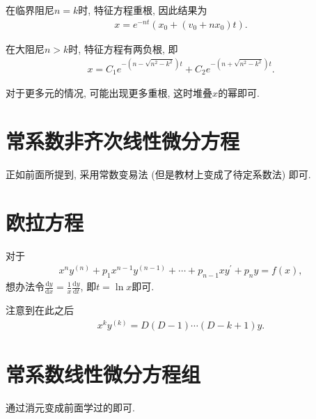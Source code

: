 \documentclass[UTF8,a4paper,11pt]{ctexart}
\begin{document}
    在临界阻尼$n=k$时, 特征方程重根, 因此结果为
    \[
    \begin{aligned}
      x=e^{-nt}\left(x_0+\left(v_0+nx_0\right)t\right).
    \end{aligned}
    \]
    
    在大阻尼$n>k$时, 特征方程有两负根, 即
    \[
    \begin{aligned}
      x=C_1e^{-\left(n-\sqrt{n^{2}-k^{2}}\right)t}+C_2e^{-\left(n+\sqrt{n^{2}-k^{2}}\right)t}.
    \end{aligned}
    \]
    
    对于更多元的情况, 可能出现更多重根, 这时堆叠$x$的幂即可.
    
  \section{常系数非齐次线性微分方程}
    正如前面所提到, 采用常数变易法 (但是教材上变成了待定系数法) 即可.
  \section{欧拉方程}
    对于
    \[
    \begin{aligned}
      x^{n}y^{(n)}+p_1x^{n-1}y^{(n-1)}+\cdots +p_{n-1}xy^{\prime}+p_ny=f\left(x\right),
    \end{aligned}
    \]
    想办法令$\frac{\mathrm{d}y}{\mathrm{d}x}=\frac{1}{x}\frac{\mathrm{d}y}{\mathrm{d}t}$,
    即$t=\ln x$即可.

    注意到在此之后
    \[
    \begin{aligned}
      x^{k}y^{(k)}=D\left(D-1\right)\cdots \left(D-k+1\right)y.
    \end{aligned}
    \]
  \section{常系数线性微分方程组}
    通过消元变成前面学过的即可.
\end{document}

